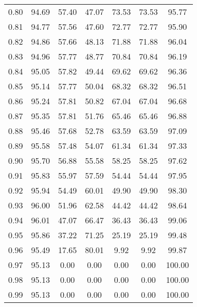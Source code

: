 \begin{tabular}{|c|c|c|c|c|c|c|}
      0.80 &     94.69 &     57.40 &      47.07 &   73.53 &      73.53 &         95.77 \\
      0.81 &     94.77 &     57.56 &      47.60 &   72.77 &      72.77 &         95.90 \\
      0.82 &     94.86 &     57.66 &      48.13 &   71.88 &      71.88 &         96.04 \\
      0.83 &     94.96 &     57.77 &      48.77 &   70.84 &      70.84 &         96.19 \\
      0.84 &     95.05 &     57.82 &      49.44 &   69.62 &      69.62 &         96.36 \\
      0.85 &     95.14 &     57.77 &      50.04 &   68.32 &      68.32 &         96.51 \\
      0.86 &     95.24 &     57.81 &      50.82 &   67.04 &      67.04 &         96.68 \\
      0.87 &     95.35 &     57.81 &      51.76 &   65.46 &      65.46 &         96.88 \\
      0.88 &     95.46 &     57.68 &      52.78 &   63.59 &      63.59 &         97.09 \\
      0.89 &     95.58 &     57.48 &      54.07 &   61.34 &      61.34 &         97.33 \\
      0.90 &     95.70 &     56.88 &      55.58 &   58.25 &      58.25 &         97.62 \\
      0.91 &     95.83 &     55.97 &      57.59 &   54.44 &      54.44 &         97.95 \\
      0.92 &     95.94 &     54.49 &      60.01 &   49.90 &      49.90 &         98.30 \\
      0.93 &     96.00 &     51.96 &      62.58 &   44.42 &      44.42 &         98.64 \\
      0.94 &     96.01 &     47.07 &      66.47 &   36.43 &      36.43 &         99.06 \\
      0.95 &     95.86 &     37.22 &      71.25 &   25.19 &      25.19 &         99.48 \\
      0.96 &     95.49 &     17.65 &      80.01 &    9.92 &       9.92 &         99.87 \\
      0.97 &     95.13 &      0.00 &       0.00 &    0.00 &       0.00 &        100.00 \\
      0.98 &     95.13 &      0.00 &       0.00 &    0.00 &       0.00 &        100.00 \\
      0.99 &     95.13 &      0.00 &       0.00 &    0.00 &       0.00 &        100.00 \\
\bottomrule
\end{tabular}
